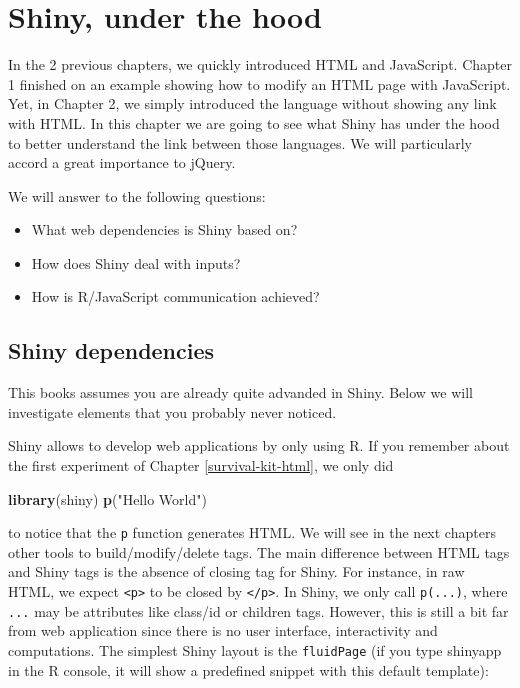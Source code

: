 \documentclass[]{book}
\newenvironment{Shaded}{\begin{snugshade}}{\end{snugshade}}
\newcommand{\KeywordTok}[1]{\textcolor[rgb]{0.13,0.29,0.53}{\textbf{#1}}}
\newcommand{\NormalTok}[1]{#1}
\newcommand{\StringTok}[1]{\textcolor[rgb]{0.31,0.60,0.02}{#1}}
\providecommand{\tightlist}{%
  \setlength{\itemsep}{0pt}\setlength{\parskip}{0pt}}
\begin{document}
\hypertarget{survival-kit-shiny}{%
\chapter{Shiny, under the hood}\label{survival-kit-shiny}}

In the 2 previous chapters, we quickly introduced HTML and JavaScript. Chapter 1 finished on an example showing how to modify an HTML page with JavaScript. Yet, in Chapter 2, we simply introduced the language without showing any link with HTML.
In this chapter we are going to see what Shiny has under the hood to better understand the link between those languages. We will particularly accord a great importance to jQuery.

We will answer to the following questions:

\begin{itemize}
\tightlist
\item
  What web dependencies is Shiny based on?
\item
  How does Shiny deal with inputs?
\item
  How is R/JavaScript communication achieved?
\end{itemize}

\hypertarget{shiny-dependencies}{%
\section{Shiny dependencies}\label{shiny-dependencies}}

This books assumes you are already quite advanded in Shiny. Below we will investigate elements that you probably never noticed.

Shiny allows to develop web applications by only using R. If you remember about the first experiment of Chapter \ref{survival-kit-html}, we only did

\begin{Shaded}
\begin{Highlighting}[]
\KeywordTok{library}\NormalTok{(shiny)}
\KeywordTok{p}\NormalTok{(}\StringTok{"Hello World"}\NormalTok{)}
\end{Highlighting}
\end{Shaded}

to notice that the \texttt{p} function generates HTML. We will see in the next chapters other tools to build/modify/delete tags. The main difference between HTML tags and Shiny tags is the absence of closing tag for Shiny. For instance, in raw HTML, we expect \texttt{\textless{}p\textgreater{}} to be closed by \texttt{\textless{}/p\textgreater{}}. In Shiny, we only call \texttt{p(...)}, where \texttt{...} may be attributes like class/id or children tags. However, this is still a bit far from web application since there is no user interface, interactivity and computations. The simplest Shiny layout is the \texttt{fluidPage} (if you type shinyapp in the R console, it will show a predefined snippet with this default template):
\end{document}
